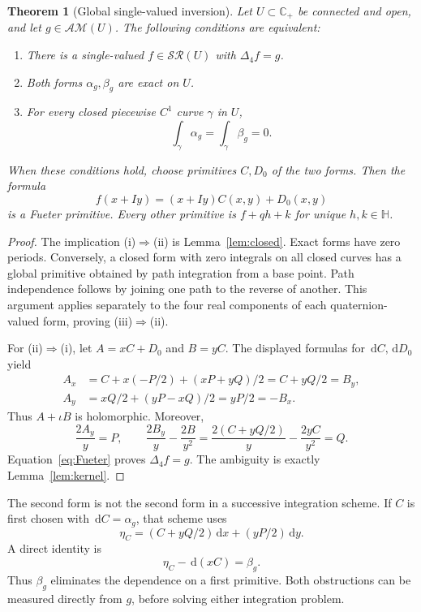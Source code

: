 \documentclass[11pt,a4paper]{article}
\numberwithin{equation}{section}
\newtheorem{theorem}{Theorem}[section]
\theoremstyle{definition}
\theoremstyle{remark}
\newcommand{\C}{\mathbb C}
\newcommand{\HH}{\mathbb H}
\newcommand{\SR}{\mathcal{SR}}
\newcommand{\AM}{\mathcal{AM}}
\newcommand{\lap}{\Delta_4}
\newcommand{\dd}{\,\mathrm d}
\begin{document}
\begin{theorem}[Global single-valued inversion]\label{thm:period}
Let $U\subset\C_+$ be connected and open, and let $g\in\AM(U)$.
The following conditions are equivalent:
\begin{enumerate}[label=\textup{(\roman*)}]
\item There is a single-valued $f\in\SR(U)$ with $\lap f=g$.
\item Both forms $\alpha_g,\beta_g$ are exact on $U$.
\item For every closed piecewise $C^1$ curve $\gamma$ in $U$,
\[
 \int_\gamma\alpha_g=\int_\gamma\beta_g=0.
\]
\end{enumerate}
When these conditions hold, choose primitives $C,D_0$ of the two forms.
Then the formula
\begin{equation}\label{eq:global-inverse}
 \boxed{\ f(x+Iy)=(x+Iy)C(x,y)+D_0(x,y)\ }
\end{equation}
is a Fueter primitive. Every other primitive is $f+qh+k$ for unique
$h,k\in\HH$.
\end{theorem}
\begin{proof}
The implication (i)$\Rightarrow$(ii) is Lemma~\ref{lem:closed}.
Exact forms have zero periods. Conversely, a closed form with zero
integrals on all closed curves has a global primitive obtained by path
integration from a base point. Path independence follows by joining one
path to the reverse of another. This argument applies separately to the
four real components of each quaternion-valued form, proving
(iii)$\Rightarrow$(ii).

For (ii)$\Rightarrow$(i), let $A=xC+D_0$ and $B=yC$. The displayed
formulas for $\dd C,\dd D_0$ yield
\begin{align*}
 A_x&=C+x(-P/2)+(xP+yQ)/2=C+yQ/2=B_y,\\
 A_y&=xQ/2+(yP-xQ)/2=yP/2=-B_x.
\end{align*}
Thus $A+\iota B$ is holomorphic. Moreover,
\[
 \frac{2A_y}{y}=P,\qquad
 \frac{2B_y}{y}-\frac{2B}{y^2}
       =\frac{2(C+yQ/2)}y-\frac{2yC}{y^2}=Q.
\]
Equation~\eqref{eq:Fueter} proves $\lap f=g$. The ambiguity is exactly
Lemma~\ref{lem:kernel}.
\end{proof}

The second form is not the second form in a successive integration scheme.
If $C$ is first chosen with $\dd C=\alpha_g$, that scheme uses
\[
 \eta_C=(C+yQ/2)\dd x+(yP/2)\dd y.
\]
A direct identity is
\begin{equation}\label{eq:remove-primitive}
 \eta_C-\dd(xC)=\beta_g.
\end{equation}
Thus $\beta_g$ eliminates the dependence on a first primitive. Both
obstructions can be measured directly from $g$, before solving either
integration problem.
\end{document}
